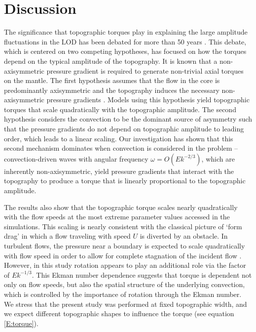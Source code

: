 




\section{Discussion}

The significance that topographic torques play in explaining the \textcolor{\revtxt}{large amplitude} fluctuations in the LOD has been debated for more than 50 years \citep{rH69}. This debate, which is centered on two competing hypotheses, has focused on how the torques depend on the typical amplitude of the topography.
It is known that a non-axisymmetric pressure gradient is required to generate non-trivial axial torques on the mantle. The first hypothesis assumes that the flow in the core is predominantly axisymmetric and the topography induces the necessary non-axisymmetric pressure gradients \citep[e.g.][]{aA77b}. Models using this hypothesis yield topographic torques that scale quadratically with the topographic amplitude. 
The second hypothesis considers the convection to be the dominant source of asymmetry such that the pressure gradients do not depend on topographic amplitude to leading order, which leads to a linear scaling. 
Our investigation has shown that this second mechanism dominates when convection is considered in the problem -- convection-driven waves with angular frequency $\omega=O( Ek^{-2/3})$, which are inherently non-axisymmetric, yield pressure gradients that interact with the topography to produce a torque that is linearly proportional to the topographic amplitude. 

The results also show that the topographic torque scales nearly quadratically with the flow speeds at the most extreme parameter values accessed in the simulations. 
This scaling is nearly consistent with the classical picture of `form drag' \textcolor{\revtxt}{in which a flow traveling with speed $U$ is diverted by an obstacle.  In turbulent flows, the pressure near a boundary is expected to scale quadratically with flow speed in order to allow for complete stagnation of the incident flow \citep{gB00}. However, in this study rotation appears to play an additional role via the factor of  $Ek^{-1/3}$.} 
This Ekman number dependence suggests that torque is dependent not only on flow speeds, but also the spatial structure of the underlying convection, which is controlled by the importance of rotation through the Ekman number. 
\textcolor{\revtxt}{We stress that the present study was performed at fixed topographic width, and we expect different topographic shapes to influence the torque (see equation \ref{E:torque}).}

